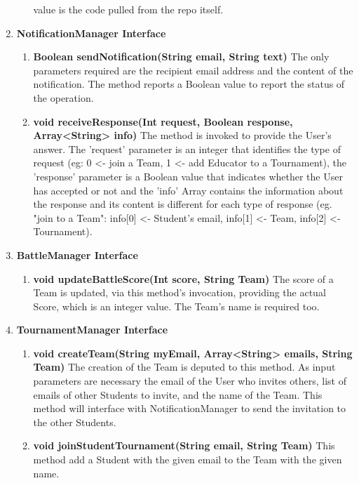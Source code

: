 \begin{enumerate}
\begin{enumerate}[label=$\bullet$]
            value is the code pulled from the repo itself.
        \end{enumerate} 
    \item \textbf{NotificationManager Interface}
        \begin{enumerate}[label=$\bullet$]
            \item \textbf{Boolean sendNotification(String email, String text)} The only parameters required are the recipient email address and the content of the notification. The method reports a Boolean value to report the status 
            of the operation.
            \item \textbf{void receiveResponse(Int request, Boolean response, Array<String> info)} The method is invoked to provide the User's answer. The 'request' parameter is an integer that identifies the type of request 
            (eg: 0 <- join a Team, 1 <- add Educator to a Tournament), the 'response' parameter is a Boolean value that indicates whether the User has accepted or not and the 'info' Array contains the information about the response 
            and its content is different for each type of response (eg. "join to a Team": info[0] <- Student's email, info[1] <- Team, info[2] <- Tournament).
        \end{enumerate}
    \item \textbf{BattleManager Interface}
        \begin{enumerate}[label=$\bullet$]
            \item \textbf{void updateBattleScore(Int score, String Team)} The score of a Team is updated, via this method's invocation, providing the actual Score, which is an integer value. The Team's name is required too.
        \end{enumerate}
    \item \textbf{TournamentManager Interface}
        \begin{enumerate}[label=$\bullet$]
        \item \textbf{void createTeam(String myEmail, Array<String> emails, String Team)} The creation of the Team is deputed to this method. As input parameters are necessary the email of the User who invites others, list of emails 
        of other Students to invite, and the name of the Team. This method will interface with NotificationManager to send the invitation to the other Students. 
        \item \textbf{void joinStudentTournament(String email, String Team)} This method add a Student with the given email to the Team with the given name.

\end{enumerate}
\end{enumerate}
